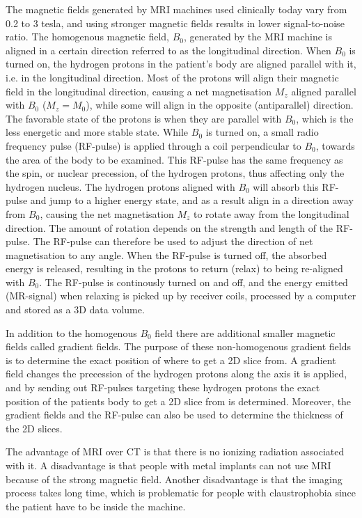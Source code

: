 The magnetic fields generated by MRI machines used clinically today vary from 0.2 to 3 tesla, and using stronger magnetic fields results in lower signal-to-noise ratio. The homogenous magnetic field, \(B_0\), generated by the MRI machine is aligned in a certain direction referred to as the longitudinal direction. When \(B_0\) is turned on, the hydrogen protons in the patient's body are aligned parallel with it, i.e. in the longitudinal direction. Most of the protons will align their magnetic field in the longitudinal direction, causing a net magnetisation \(M_z\) aligned parallel with \(B_0\) (\(M_z = M_0\)), while some will align in the opposite (antiparallel) direction. The favorable state of the protons is when they are parallel with \(B_0\), which is the less energetic and more stable state. While \(B_0\) is turned on, a small radio frequency pulse (RF-pulse) is applied through a coil perpendicular to \(B_0\), towards the area of the body to be examined. This RF-pulse has the same frequency as the spin, or nuclear precession, of the hydrogen protons, thus affecting only the hydrogen nucleus. The hydrogen protons aligned with \(B_0\) will absorb this RF-pulse and jump to a higher energy state, and as a result align in a direction away from \(B_0\), causing the net magnetisation \(M_z\) to rotate away from the longitudinal direction. The amount of rotation depends on the strength and length of the RF-pulse. The RF-pulse can therefore be used to adjust the direction of net magnetisation to any angle. When the RF-pulse is turned off, the absorbed energy is released, resulting in the protons to return (relax) to being re-aligned with \(B_0\). The RF-pulse is continously turned on and off, and the energy emitted (MR-signal) when relaxing is picked up by receiver coils, processed by a computer and stored as a 3D data volume. 

In addition to the homogenous \(B_0\) field there are additional smaller magnetic fields called gradient fields. The purpose of these non-homogenous gradient fields is to determine the exact position of where to get a 2D slice from. A gradient field changes the precession of the hydrogen protons along the axis it is applied, and by sending out RF-pulses targeting these hydrogen protons the exact position of the patients body to get a 2D slice from is determined. Moreover, the gradient fields and the RF-pulse can also be used to determine the thickness of the 2D slices. 

The advantage of MRI over CT is that there is no ionizing radiation associated with it. A disadvantage is that people with metal implants can not use MRI because of the strong magnetic field. Another disadvantage is that the imaging process takes long time, which is problematic for people with claustrophobia since the patient have to be inside the machine.

